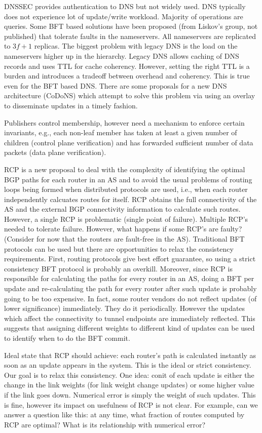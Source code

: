 \documentclass[twocolumn,10pt]{article}
\begin{document}
 DNSSEC provides authentication to DNS but not widely used. DNS typically does not experience lot
of update/write workload. Majority of operations are queries. Some BFT based solutions have been proposed 
(from Liskov's group, not published) that tolerate faults in the nameservers. All nameservers are replicated to 
$3f+1$ replicas. The biggest problem with legacy DNS is the load on the nameservers higher up in the hierarchy.
Legacy DNS allows caching of DNS records and uses TTL for cache coherency. However, setting the right TTL is a burden
and introduces a tradeoff between overhead and coherency. This is true even for the BFT based DNS. There are some
proposals for a new DNS architecture (CoDoNS) which attempt to solve this problem via using an overlay to disseminate
updates in a timely fashion. 


 Publishers control membership, however need a mechanism to enforce certain invariants, e.g., 
each non-leaf member has taken at least a given number of children (control plane verification) and 
has forwarded sufficient number of data packets (data plane verification). 

 RCP is a new proposal to deal with the complexity of identifying the optimal BGP paths for each 
router in an AS and to avoid the usual problems of routing loops being formed when distributed protocols are used, i.e., when
each router independently calcuates routes for itself. 
RCP obtains the full connectivity of the AS and the external BGP connectivity information to calculate such routes. However, a single 
RCP is problematic (single point of failure). Multiple RCP's needed to tolerate failure. However, what happens if some RCP's are faulty? 
(Consider for now that the routers are fault-free in the AS). Traditional BFT protocols can be used but there are opportunities to relax
the consistency requirements. First, routing protocols give best effort guarantee, so using a strict consistency BFT protocol
is probably an overkill. Moreover, since RCP is responsible for calculating the paths for every router in an AS, doing a BFT per
update and re-calculating the path for every router after such update is probably going to be too expensive. 
In fact, some router vendors do not reflect updates (of lower significance) immediately. 
They do it periodically. However the updates which affect the connectivity to tunnel endpoints are immediately reflected. 
This suggests that assigning different weights to different kind of updates can be used to identify when to do the BFT commit. 

 Ideal state that RCP should achieve: each router's path is calculated instantly as soon as 
an update appears in the system. This is the ideal or 
strict consistency. Our goal is to relax this consistency. One idea: conit of each update is either the change in the link
weights (for link weight change updates) or some higher value if the link goes down. Numerical error is simply the weight of
such updates. This is fine, however its impact on usefulness of RCP is not clear. For example, can we answer a question like
this: at any time, what fraction of routes computed by RCP are optimal? What is its relationship with numerical error?
\fi
\end{document}
